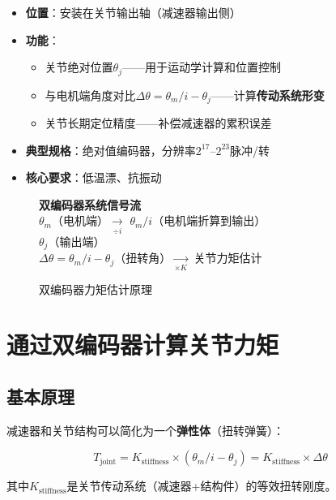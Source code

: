 \begin{itemize}
  \item \textbf{位置}：安装在关节输出轴（减速器输出侧）
  \item \textbf{功能}：
  \begin{itemize}
    \item 关节绝对位置$\theta_j$——用于运动学计算和位置控制
    \item 与电机端角度对比$\Delta\theta = \theta_m/i - \theta_j$——计算\textbf{传动系统形变}
    \item 关节长期定位精度——补偿减速器的累积误差
  \end{itemize}
  \item \textbf{典型规格}：绝对值编码器，分辨率$2^{17}$--$2^{23}$脉冲/转
  \item \textbf{核心要求}：低温漂、抗振动
\end{itemize}

\begin{figure}[H]
\centering
\begin{tcolorbox}[colback=lightgray]
\centering
\textbf{双编码器系统信号流}\\
\vspace{5pt}
$\theta_m$（电机端）$\underset{\div i}{\longrightarrow}$ $\theta_m/i$（电机端折算到输出）\\
$\theta_j$（输出端）\\
$\Delta\theta = \theta_m/i - \theta_j$（扭转角）$\underset{\times K}{\longrightarrow}$ 关节力矩估计
\end{tcolorbox}
\caption{双编码器力矩估计原理}
\label{fig:dual_encoder_principle}
\end{figure}

\section{通过双编码器计算关节力矩}

\subsection{基本原理}

减速器和关节结构可以简化为一个\textbf{弹性体}（扭转弹簧）：

\begin{equation}
T_{\text{joint}} = K_{\text{stiffness}} \times (\theta_m/i - \theta_j) = K_{\text{stiffness}} \times \Delta\theta
\end{equation}

其中$K_{\text{stiffness}}$是关节传动系统（减速器+结构件）的等效扭转刚度。

